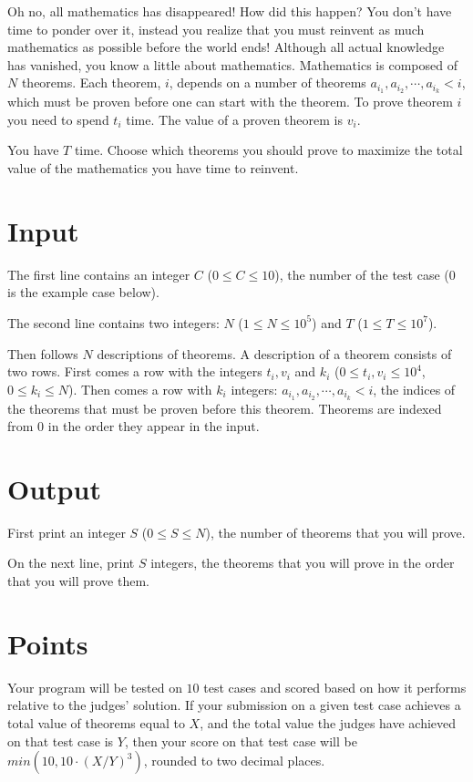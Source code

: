 
Oh no, all mathematics has disappeared! How did this happen? You don't have time to ponder over it,
instead you realize that you must reinvent as much mathematics as possible before the world ends!
Although all actual knowledge has vanished, you know a little about mathematics.
Mathematics is composed of $N$ theorems. Each theorem, $i$, depends on a number of theorems
$a_{i_1}, a_{i_2}, \cdots, a_{i_k} < i$, which must be proven before one can start with the theorem.
To prove theorem $i$ you need to spend $t_i$ time. The value of a proven theorem is $v_i$.

You have $T$ time. Choose which theorems you should prove to maximize the total value of the mathematics you have time to reinvent.


\section*{Input}
The first line contains an integer $C$ ($0 \leq C \leq 10$), the number of the test case ($0$ is the example case below).

The second line contains two integers: $N$ ($1 \le N \le 10^5$) and $T$ ($1 \le T \le 10^7$).

Then follows $N$ descriptions of theorems.
A description of a theorem consists of two rows. First comes a row with the integers $t_i, v_i$ and $k_i$
($0 \le t_i, v_i \le 10^4$, $0 \le k_i \le N$).
Then comes a row with $k_i$ integers: $a_{i_1}, a_{i_2}, \cdots, a_{i_k} < i$, the indices of the theorems that
must be proven before this theorem.
Theorems are indexed from 0 in the order they appear in the input.

\section*{Output}
First print an integer $S$ ($0 \leq S \leq N$), the number of theorems that you will prove.

On the next line, print $S$ integers, the theorems that you will prove in the order that you will prove them.

\section*{Points}
Your program will be tested on $10$ test cases and scored based on how it performs relative to the judges' solution.
If your submission on a given test case achieves a total value of theorems equal to $X$, and the total value the
judges have achieved on that test case is $Y$,
then your score on that test case will be $min(10, 10 \cdot (X / Y)^3)$, rounded to two decimal places.

